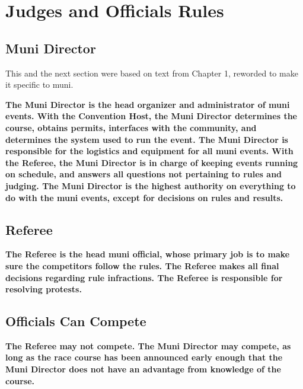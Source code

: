 \chapter{Judges and Officials Rules}

\section{Muni Director}

\begin{framed}
This and the next section were based on text from Chapter 1, reworded to make it specific to muni.
\end{framed}

\textbf{The Muni Director is the head organizer and administrator of muni
events.  With the Convention Host, the Muni Director determines the course,
obtains permits, interfaces with the community, and determines the system
used to run the event.  The Muni Director is responsible for the logistics and
equipment for all muni events.  With the Referee, the
Muni Director is in charge of keeping events running on schedule, and
answers all questions not pertaining to rules and judging.  The Muni
Director is the highest authority on everything to do with the muni
events, except for decisions on rules and results.}

\section{Referee}

\textbf{The Referee is the head muni official, whose primary job is to make sure
the competitors follow the rules.  The Referee makes all final decisions
regarding rule infractions. The Referee is responsible for resolving
protests.}

\section{Officials Can Compete}

\textbf{The Referee may not compete.  The Muni Director may compete, as long as the race course has been announced early enough that the Muni Director does not have an advantage from knowledge of the course.}

